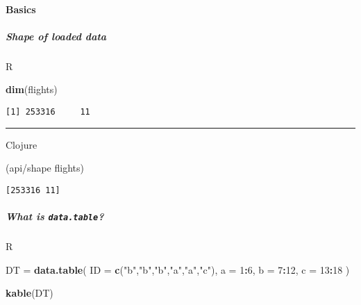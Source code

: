 \documentclass[]{article}
\newenvironment{Shaded}{\begin{snugshade}}{\end{snugshade}}
\newcommand{\KeywordTok}[1]{\textcolor[rgb]{0.13,0.29,0.53}{\textbf{#1}}}
\newcommand{\DataTypeTok}[1]{\textcolor[rgb]{0.13,0.29,0.53}{#1}}
\newcommand{\DecValTok}[1]{\textcolor[rgb]{0.00,0.00,0.81}{#1}}
\newcommand{\StringTok}[1]{\textcolor[rgb]{0.31,0.60,0.02}{#1}}
\newcommand{\OperatorTok}[1]{\textcolor[rgb]{0.81,0.36,0.00}{\textbf{#1}}}
\newcommand{\NormalTok}[1]{#1}
\let\oldparagraph\paragraph
\renewcommand{\paragraph}[1]{\oldparagraph{#1}\mbox{}}
\let\oldsubparagraph\subparagraph
\renewcommand{\subparagraph}[1]{\oldsubparagraph{#1}\mbox{}}
\begin{document}
\paragraph{Basics}\label{basics}

\subparagraph{Shape of loaded data}\label{shape-of-loaded-data}

R

\begin{Shaded}
\begin{Highlighting}[]
\KeywordTok{dim}\NormalTok{(flights)}
\end{Highlighting}
\end{Shaded}

\begin{verbatim}
[1] 253316     11
\end{verbatim}

\begin{center}\rule{0.5\linewidth}{0.5pt}\end{center}

Clojure

\begin{Shaded}
\begin{Highlighting}[]
\NormalTok{(api/shape flights)}
\end{Highlighting}
\end{Shaded}

\begin{verbatim}
[253316 11]
\end{verbatim}

\subparagraph{\texorpdfstring{What is
\texttt{data.table}?}{What is data.table?}}\label{what-is-data.table}

R

\begin{Shaded}
\begin{Highlighting}[]
\NormalTok{DT =}\StringTok{ }\KeywordTok{data.table}\NormalTok{(}
  \DataTypeTok{ID =} \KeywordTok{c}\NormalTok{(}\StringTok{"b"}\NormalTok{,}\StringTok{"b"}\NormalTok{,}\StringTok{"b"}\NormalTok{,}\StringTok{"a"}\NormalTok{,}\StringTok{"a"}\NormalTok{,}\StringTok{"c"}\NormalTok{),}
  \DataTypeTok{a =} \DecValTok{1}\OperatorTok{:}\DecValTok{6}\NormalTok{,}
  \DataTypeTok{b =} \DecValTok{7}\OperatorTok{:}\DecValTok{12}\NormalTok{,}
  \DataTypeTok{c =} \DecValTok{13}\OperatorTok{:}\DecValTok{18}
\NormalTok{)}

\KeywordTok{kable}\NormalTok{(DT)}
\end{Highlighting}
\end{Shaded}
\end{document}
